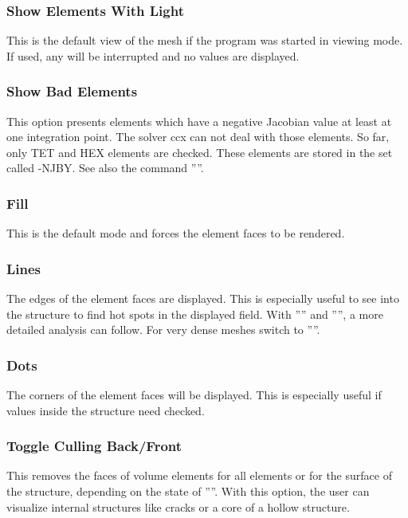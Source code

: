 \documentclass{article}
\begin{document}
\subsubsection{\label{Show Elements With Light}Show Elements With Light}
This is the default view of the mesh if the program was started in viewing mode. If used, any  will be interrupted and no values are displayed.  

\subsubsection{\label{Show Bad Elements}Show Bad Elements}
This option presents elements which have a negative Jacobian value at least at one integration point. The solver ccx can not deal with those elements. So far, only TET and HEX elements are checked. These elements are stored in the set called -NJBY. See also the command ''''.

\subsubsection{\label{Fill}Fill}
This is the default mode and forces the element faces to be rendered.

\subsubsection{\label{Lines}Lines}
The edges of the element faces are displayed. This is especially useful to see into the structure to find hot spots in the displayed field. With '''' and '''', a more detailed analysis can follow. For very dense meshes switch to ''''.

\subsubsection{\label{Dots}Dots}
The corners of the element faces will be displayed. This is especially useful if values inside the structure need checked.

\subsubsection{\label{Toggle Culling Back/Front}Toggle Culling Back/Front}
This removes the faces of volume elements for all elements or for the surface of the structure, depending on the state of ''''. With this option, the user can visualize internal structures like cracks or a core of a hollow structure.
\end{document}
